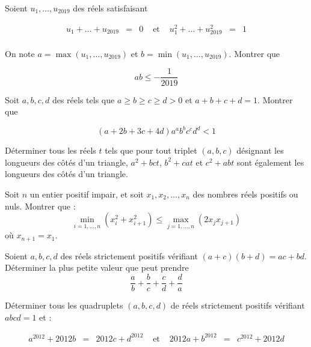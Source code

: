 \begin{exo}[IMO SL 2019 A2]
Soient $u_1, \dots , u_{2019}$ des réels satisfaisant

$$\begin{array}{lllllll}
u_1 + \ldots + u_{2019} &=& 0 & \text{ et } & u_1^2+ \ldots + u_{2019}^2 &=& 1 \\
\end{array}$$

On note $a= \max (u_1, \ldots , u_{2019})$ et $b= \min (u_1, \ldots , u_{2019})$. Montrer que

$$ab \le - \frac1{2019}$$
\end{exo}

\begin{exo}[IMO 2020 P2]
Soit $a,b,c,d$ des réels tels que $a\ge b \ge c\ge d >0$ et $a+b+c+d=1$. Montrer que

$$(a+2b+3c+4d)a^ab^bc^cd^d<1$$
\end{exo}


\begin{exo}[EGMO 2014 P1]
Déterminer tous les réels $t$ tels que pour tout triplet $(a,b,c)$ désignant les longueurs des côtés d'un triangle, $a^2+bct$, $b^2+cat$ et $c^2+abt$ sont également les longueurs des côtés d'un triangle.
\end{exo}

\begin{exo}[EGMO 2016 P1]
Soit $n$ un entier positif impair, et soit $x_1,x_2,\dots,x_n$ des nombres réels positifs ou nuls. Montrer que :
$$\min_{i=1,\dots,n}(x_i^2+x_{i+1}^2) \le \max_{j=1,\dots,n}(2x_jx_{j+1})$$
où $x_{n+1}=x_1$.
\end{exo}


\begin{exo}[IMO SL 2020 A3]
Soient $a,b,c,d$ des réels strictement positifs vérifiant $(a+c)(b+d)=ac+bd$. Déterminer la plus petite valeur que peut prendre
$$\frac{a}{b}+\frac{b}{c}+\frac{c}{d}+\frac{d}{a}$$
\end{exo}

\begin{exo}[BXMO 2012]
Déterminer tous les quadruplets $(a,b,c,d)$ de réels strictement positifs vérifiant $abcd=1$ et :

$$\begin{array}{lllllll}
a^{2012}+2012b &=& 2012c+d^{2012} &\text{ et } & 2012a+b^{2012} &=& c^{2012}+2012d\\
\end{array}$$
\end{exo}

